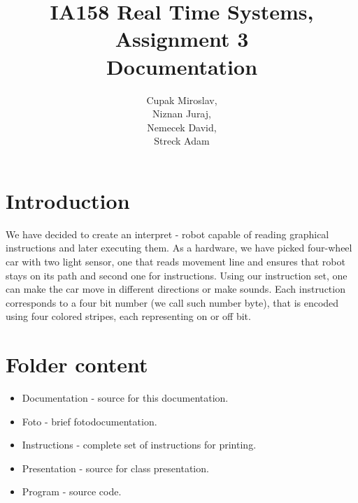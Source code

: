 \documentclass{article}
\title{IA158 Real Time Systems, Assignment 3 \\ Documentation}
\begin{document}
\author{Cupak Miroslav,\\
		Niznan Juraj, \\
        Nemecek David,\\
		Streck Adam}
\maketitle

\section{Introduction}
We have decided to create an interpret - robot capable of reading graphical instructions and later executing them. As a hardware, we have picked four-wheel car with two light sensor, one that reads movement line and ensures that robot stays on its path and second one for instructions. Using our instruction set, one can make the car move in different directions or make sounds. Each instruction corresponds to a four bit number (we call such number byte), that is encoded using four colored stripes, each representing on or off bit. 









\section{Folder content}
\begin{itemize}
	\item Documentation - source for this documentation.
	\item Foto - brief fotodocumentation.
	\item Instructions - complete set of instructions for printing.
	\item Presentation - source for class presentation.
	\item Program - source code.
\end{itemize}
\end{document}
